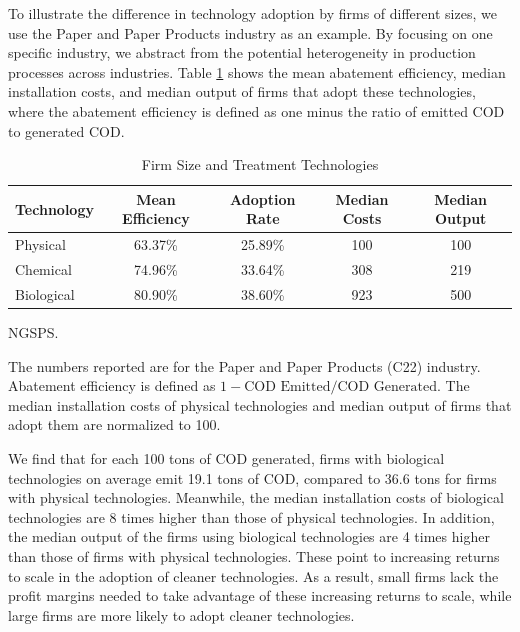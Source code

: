 \documentclass[AEJ]{AEA}
\begin{document}
To illustrate the difference in technology adoption by firms of different sizes, we use the Paper and Paper Products industry as an example. By focusing on one specific industry, we abstract from the potential heterogeneity in production processes across industries. %
Table \ref{tab:techeffi} shows the mean abatement efficiency, median installation costs, and median output of firms that adopt these technologies, where the {abatement efficiency} is defined as one minus the ratio of {emitted COD} to {generated COD}. %
\begin{table}[t]
\footnotesize
\centering
\caption{Firm Size and Treatment Technologies}
\begin{tabular}{lcccc}
    \hline \hline
    Technology  & Mean Efficiency & Adoption Rate & Median Costs & Median Output \\
    \hline
    Physical    & 63.37\%         & 25.89\%       & 100                   & 100                       \\
    Chemical    & 74.96\%         & 33.64\%       & 308                   & 219                       \\
    Biological  & 80.90\%         & 38.60\%       & 923                   & 500                       \\
    \hline
\end{tabular}
\label{tab:techeffi}
\begin{tablenotes}[Source]
     NGSPS.
\end{tablenotes}
\begin{tablenotes}
     The numbers reported are for the Paper and Paper Products (C22) industry. Abatement efficiency is defined as $1 - \text{COD Emitted}/\text{COD Generated}$. The median installation costs of physical technologies and median output of firms that adopt them are normalized to 100.
\end{tablenotes}
\end{table}
We find that for each 100 tons of COD generated, firms with biological technologies on average emit 19.1 tons of COD, compared to 36.6 tons for firms with physical technologies. Meanwhile, the median installation costs of biological technologies are 8 times higher than those of physical technologies. In addition, the median output of the firms using biological technologies are 4 times higher than those of firms with physical technologies. These point to increasing returns to scale in the adoption of cleaner technologies. As a result, small firms lack the profit margins needed to take advantage of these increasing returns to scale, while large firms are more likely to adopt cleaner technologies.
\end{document}
